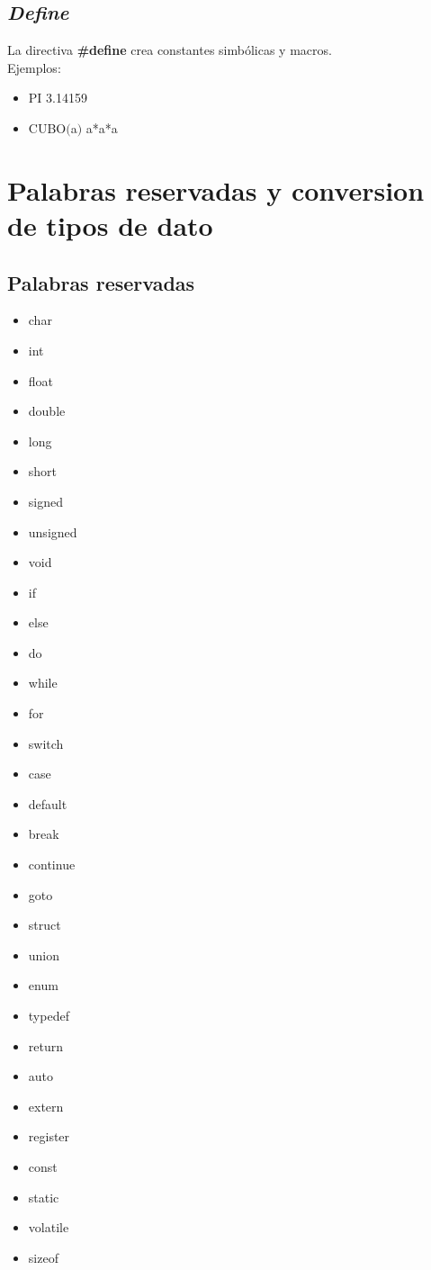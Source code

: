 \documentclass[]{article}
\begin{document}
	\subsection{\textit{Define}}
	La directiva \textbf{\#define} crea constantes simbólicas y macros.\\
	
	Ejemplos:
	
	\begin{itemize}
		\item PI 3.14159
		\item CUBO$($a$)$ a*a*a
	\end{itemize}
	
	\section{Palabras reservadas y conversion de tipos de dato}
	
	\subsection{Palabras reservadas}
	
	\begin{multicols}{5}
		\begin{itemize}
			\item char
			\item int
			\item float
			\item double
			\item long
			\item short
			\item signed
			\item unsigned
			\item void
			\item if
			\item else
			\item do
			\item while
			\item for
			\item switch
			\item case
			\item default
			\item break
			\item continue
			\item goto
			\item struct
			\item union
			\item enum
			\item typedef
			\item return
			\item auto
			\item extern
			\item register
			\item const
			\item static
			\item volatile
			\item sizeof
		\end{itemize}
	\end{multicols}
	
\end{document}
